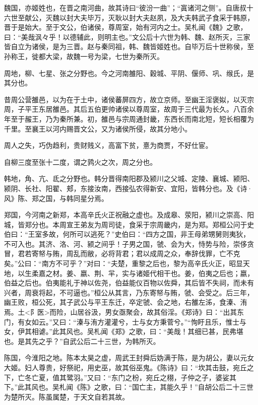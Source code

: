 \documentclass[]{article}
\begin{document}
魏国，亦姬姓也，在晋之南河曲，故其诗曰``彼汾一曲''；``寘诸河之侧''。自唐叔十六世至献公，灭魏以封大夫毕万，灭耿以封大夫赵夙，及大夫韩武子食采于韩原，晋于是始大。至于文公，伯诸侯，尊周室，始有河内之士。吴札闻《魏》之歌，曰：``美哉沨々乎！以德辅此，则明主也。''文公后十六世为韩、魏、赵所灭，三家皆自立为诸侯，是为三晋。赵与秦同祖，韩、魏皆姬姓也。自毕万后十世称侯，至孙称王，徙都大梁，故魏一号为梁，七世为秦所灭。

周地，柳、七星、张之分野也。今之河南雒阳、穀城、平阴、偃师、巩、缑氏，是其分也。

昔周公营雒邑，以为在于土中，诸侯蕃屏四方，故立京师。至幽王淫褒姒，以灭宗周，子平王东居雒邑。其后五伯更帅诸侯以尊周室，故周于三代最为长久。八百余年至于赧王，乃为秦所兼。初，雒邑与宗周通封畿，东西长而南北短，短长相覆为千里。至襄王以河内赐晋文公，又为诸侯所侵，故其分地小。

周人之失，巧伪趋利，贵财贱义，高富下贫，憙为商贾，不好仕宦。

自柳三度至张十二度，谓之鹑火之次，周之分也。

韩地，角、亢、氐之分野也。韩分晋得南阳郡及颍川之父城、定陵、襄城、颍阳、颍阴、长社、阳翟、郏，东接汝南，西接弘农得新安、宜阳，皆韩分也。及《诗·风》陈、郑之国，与韩同星分焉。

郑国，今河南之新郑，本高辛氏火正祝融之虚也。及成皋、荥阳，颍川之崇高、阳城，皆郑分也。本周宣王弟友为周司徒，食采于宗周畿内，是为郑。郑桓公问于史伯曰：``王室多故，何所可以逃死？''史伯曰：``四方之国，非王母弟甥舅则夷狄，不可入也。其济、洛、河、颍之间乎！子男之国，虢、会为大，恃势与险，崇侈贪冒，君若寄帑与贿，周乱而敝，必将背君；君以成周之众，奉辞伐罪，亡不克矣。''公曰：``南方不可乎？''对曰：``夫楚，重黎之后也，黎为高辛氏火正，昭显天地，以生柔嘉之材。姜、嬴、荆、羋，实与诸姬代相干也。姜，伯夷之后也；嬴，伯益之后也。伯夷能礼于神以佐尧，伯益能仪百物以佐舜，其后皆不失祠，而未有兴者，周衰将起，不可逼也。''桓公从其言，乃东寄帑与贿，虢、会受之。后三年，幽王败，桓公死，其子武公与平王东迁，卒定虢、会之地，右雒左泲，食溱、洧焉。土\textless{}阝医\textgreater{}而险，山居谷汲，男女亟聚会，故其俗淫。《郑诗》曰：``出其东门，有女如云。''又曰：``溱与洧方灌灌兮，士与女方秉菅兮。''``恂盱且乐，惟士与女，伊其相谑。''此其风也。吴札闻《郑》之歌，曰：``美哉！其细已甚，民弗堪也。是其先之乎？''自武公后二十三世，为韩所灭。

陈国，今淮阳之地。陈本太昊之虚，周武王封舜后妫满于陈，是为胡公，妻以元女大姬。妇人尊贵，好祭祀，用史巫，故其俗巫鬼。《陈诗》曰：``坎其击鼓，宛丘之下，亡冬亡夏，值其鹭羽。''又曰：``东门之枌，宛丘之栩，子仲之子，婆娑其下。''此其风也。吴札闻《陈》之歌，曰：``国亡主，其能久乎！''自胡公后二十三世为楚所灭。陈虽属楚，于天文自若其故。
\end{document}

